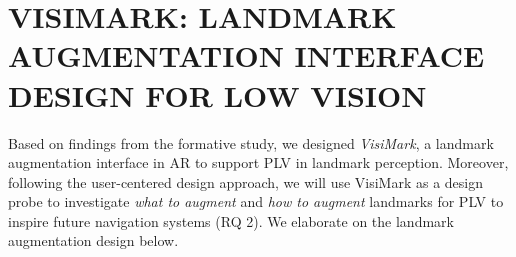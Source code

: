 \section{VISIMARK: LANDMARK AUGMENTATION INTERFACE DESIGN FOR LOW VISION}
Based on findings from the formative study, we designed \textit{VisiMark}, a landmark augmentation interface in AR to support PLV in landmark perception. Moreover, following the user-centered design approach, we will use VisiMark as a design probe to investigate \textit{what to augment} and \textit{how to augment} landmarks for PLV to inspire future navigation systems (RQ 2). We elaborate on the landmark augmentation design  below.




